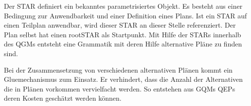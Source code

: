Der \ac{STAR} definiert ein bekanntes parametrisiertes Objekt. Es besteht aus einer Bedingung zur Anwendbarkeit und einer Definition  eines Plans. Ist ein STAR auf einen Teilplan anwendbar, wird dieser STAR an dieser Stelle referenziert. Der Plan selbst hat einen rootSTAR als Startpunkt. Mit Hilfe der STARs innerhalb des \ac{QGM}s entsteht  eine Grammatik mit deren Hilfe alternative Pläne zu finden sind. 

Bei der Zusammensetzung von verschiedenen alternativen Plänen kommt ein Gluemechanismus zum Einsatz. Er verhindert, dass die Anzahl der Alternativen die in Plänen vorkommen vervielfacht werden. So entstehen aus GQMs QEPs deren Kosten geschätzt werden können.

